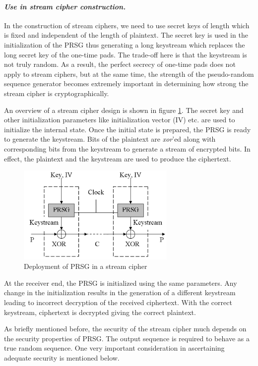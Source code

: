 \paragraph{\textit{Use in stream cipher construction.}}
\label{para:stream-construction} 
In the construction of stream ciphers, we need to use secret keys of length which is fixed and independent of the length of plaintext. The secret key is used in the initialization of the PRSG thus generating a long keystream which replaces the long secret key of the one-time pads. The trade-off here is that the keystream is not truly random. As a result, the perfect secrecy of one-time pads does not apply to stream ciphers, but at the same time, the strength of the pseudo-random sequence generator becomes extremely important in determining how strong the stream cipher is cryptographically.

An overview of a stream cipher design is shown in figure \ref{fig:stream-cipher}. The secret key and other initialization parameters like initialization vector (IV) etc. are used to initialize the internal state. Once the initial state is prepared, the PRSG is ready to generate the keystream. Bits of the plaintext are \emph{xor}'ed along with corresponding bits from the keystream to generate a stream of encrypted bits. In effect, the plaintext and the keystream are used to produce the ciphertext.

\begin{figure}[ht!]
	\centering
		\includegraphics[width=3in]{./figures/stream-cipher.PNG}
	\caption{Deployment of PRSG in a stream cipher}	
	\label{fig:stream-cipher}
\end{figure}

At the receiver end, the PRSG is initialized using the same parameters. Any change in the initialization results in the generation of a different keystream leading to incorrect decryption of the received ciphertext. With the correct keystream, ciphertext is decrypted giving the correct plaintext. 

As briefly mentioned before, the security of the stream cipher much depends on the security properties of PRSG. The output sequence is required to behave as a true random sequence. One very important consideration in ascertaining adequate security \cite{robshaw1995sct} is mentioned below.

